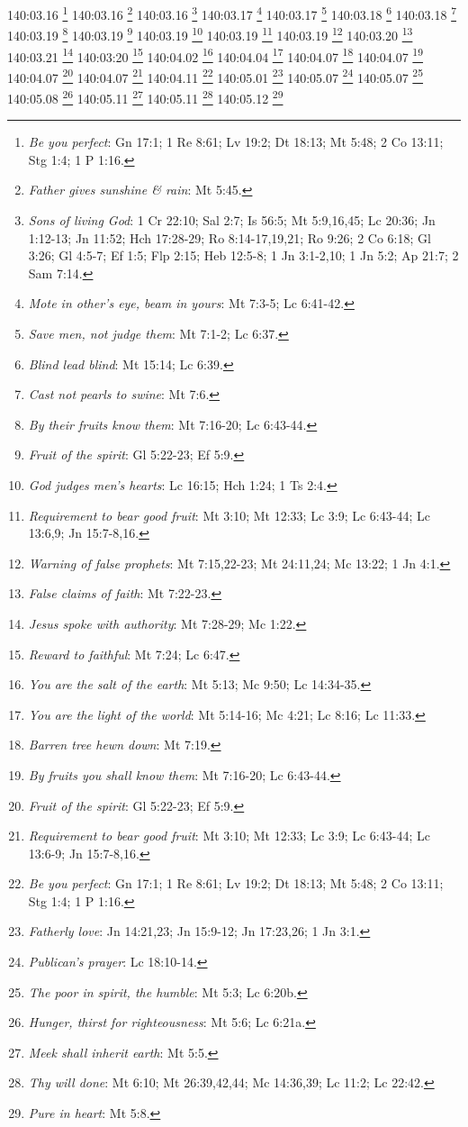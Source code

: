 {{{140:03.16 \footnote{\textit{Be you perfect}: Gn 17:1; 1 Re 8:61; Lv 19:2; Dt 18:13; Mt 5:48; 2 Co 13:11; Stg 1:4; 1 P 1:16.}
140:03.16 \footnote{\textit{Father gives sunshine & rain}: Mt 5:45.}
140:03.16 \footnote{\textit{Sons of living God}: 1 Cr 22:10; Sal 2:7; Is 56:5; Mt 5:9,16,45; Lc 20:36; Jn 1:12-13; Jn 11:52; Hch 17:28-29; Ro 8:14-17,19,21; Ro 9:26; 2 Co 6:18; Gl 3:26; Gl 4:5-7; Ef 1:5; Flp 2:15; Heb 12:5-8; 1 Jn 3:1-2,10; 1 Jn 5:2; Ap 21:7; 2 Sam 7:14.}
140:03.17 \footnote{\textit{Mote in other's eye, beam in yours}: Mt 7:3-5; Lc 6:41-42.}
140:03.17 \footnote{\textit{Save men, not judge them}: Mt 7:1-2; Lc 6:37.}
140:03.18 \footnote{\textit{Blind lead blind}: Mt 15:14; Lc 6:39.}
140:03.18 \footnote{\textit{Cast not pearls to swine}: Mt 7:6.}
140:03.19 \footnote{\textit{By their fruits know them}: Mt 7:16-20; Lc 6:43-44.}
140:03.19 \footnote{\textit{Fruit of the spirit}: Gl 5:22-23; Ef 5:9.}
140:03.19 \footnote{\textit{God judges men's hearts}: Lc 16:15; Hch 1:24; 1 Ts 2:4.}
140:03.19 \footnote{\textit{Requirement to bear good fruit}: Mt 3:10; Mt 12:33; Lc 3:9; Lc 6:43-44; Lc 13:6,9; Jn 15:7-8,16.}
140:03.19 \footnote{\textit{Warning of false prophets}: Mt 7:15,22-23; Mt 24:11,24; Mc 13:22; 1 Jn 4:1.}
140:03.20 \footnote{\textit{False claims of faith}: Mt 7:22-23.}
140:03.21 \footnote{\textit{Jesus spoke with authority}: Mt 7:28-29; Mc 1:22.}
140:03:20 \footnote{\textit{Reward to faithful}: Mt 7:24; Lc 6:47.}
140:04.02 \footnote{\textit{You are the salt of the earth}: Mt 5:13; Mc 9:50; Lc 14:34-35.}
140:04.04 \footnote{\textit{You are the light of the world}: Mt 5:14-16; Mc 4:21; Lc 8:16; Lc 11:33.}
140:04.07 \footnote{\textit{Barren tree hewn down}: Mt 7:19.}
140:04.07 \footnote{\textit{By fruits you shall know them}: Mt 7:16-20; Lc 6:43-44.}
140:04.07 \footnote{\textit{Fruit of the spirit}: Gl 5:22-23; Ef 5:9.}
140:04.07 \footnote{\textit{Requirement to bear good fruit}: Mt 3:10; Mt 12:33; Lc 3:9; Lc 6:43-44; Lc 13:6-9; Jn 15:7-8,16.}
140:04.11 \footnote{\textit{Be you perfect}: Gn 17:1; 1 Re 8:61; Lv 19:2; Dt 18:13; Mt 5:48; 2 Co 13:11; Stg 1:4; 1 P 1:16.}
140:05.01 \footnote{\textit{Fatherly love}: Jn 14:21,23; Jn 15:9-12; Jn 17:23,26; 1 Jn 3:1.}
140:05.07 \footnote{\textit{Publican's prayer}: Lc 18:10-14.}
140:05.07 \footnote{\textit{The poor in spirit, the humble}: Mt 5:3; Lc 6:20b.}
140:05.08 \footnote{\textit{Hunger, thirst for righteousness}: Mt 5:6; Lc 6:21a.}
140:05.11 \footnote{\textit{Meek shall inherit earth}: Mt 5:5.}
140:05.11 \footnote{\textit{Thy will done}: Mt 6:10; Mt 26:39,42,44; Mc 14:36,39; Lc 11:2; Lc 22:42.}
140:05.12 \footnote{\textit{Pure in heart}: Mt 5:8.}
}}}

